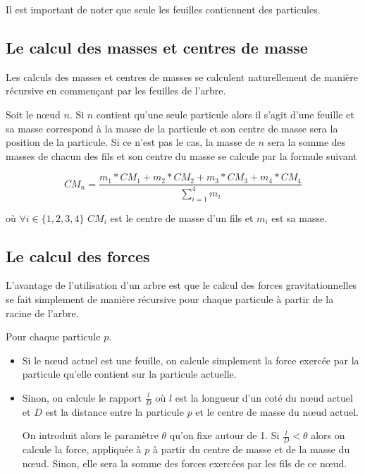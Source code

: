 Il est important de noter que seule les feuilles contiennent des particules.

\subsection{Le calcul des masses et centres de masse}

Les calculs des masses et centres de masses se calculent naturellement de manière récursive en commençant par les feuilles de l'arbre.

Soit le nœud $n$. 
Si $n$ contient qu'une seule particule alors il s'agit d'une feuille et sa masse correspond à la masse de la particule et son centre de masse sera la position de la particule. Si ce n'est pas le cas, la masse de $n$ sera la somme des masses de chacun des fils et son centre du masse se calcule par la formule suivant

\begin{equation}
    CM_n = \frac{m_1*CM_1 + m_2*CM_2+ m_3*CM_3 + m_4*CM_4 }{\sum_{i=1}^{4}{m_i}}
\end{equation}

où $\forall i\in \{1,2,3,4\}$ $CM_i$ est le centre de masse d'un fils et $m_i$ est sa masse.

\subsection{Le calcul des forces}

L'avantage de l'utilisation d'un arbre est que le calcul des forces gravitationnelles se fait simplement de manière récursive pour chaque particule à partir de la racine de l'arbre.

Pour chaque particule $p$.

\begin{itemize}
\item Si le nœud actuel est une feuille, on calcule simplement la force exercée par la particule qu'elle contient sur la particule actuelle.

\item Sinon, on calcule le rapport $\frac{l}{D}$ où $l$ est la
longueur d'un coté du nœud actuel  et $D$ est la distance entre la particule $p$ et le centre de masse du nœud actuel.

On introduit alors le paramètre $\theta$ qu'on fixe autour de 1.
Si $\frac{l}{D} < \theta$ alors on calcule la force, appliquée à $p$ à partir du centre de masse et de la masse du nœud. Sinon, elle sera la somme des forces exercées par les fils de ce nœud.
\end{itemize}


